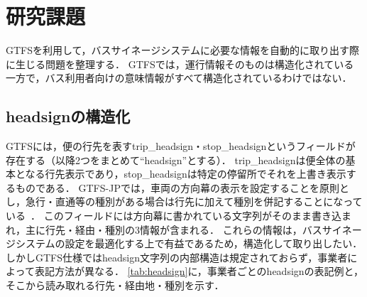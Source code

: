 \section{研究課題}
GTFSを利用して，バスサイネージシステムに必要な情報を自動的に取り出す際に生じる問題を整理する．
GTFSでは，運行情報そのものは構造化されている一方で，バス利用者向けの意味情報がすべて構造化されているわけではない．

\subsection{headsignの構造化}
\label{subsection:headsign}
GTFSには，便の行先を表すtrip\_headsign・stop\_headsignというフィールドが存在する（以降2つをまとめて``headsign''とする）．
trip\_headsignは便全体の基本となる行先表示であり，stop\_headsignは特定の停留所でそれを上書き表示するものである．
GTFS-JPでは，車両の方向幕の表示を設定することを原則とし，急行・直通等の種別がある場合は行先に加えて種別を併記することになっている~\cite{GTFSJPv4}．
このフィールドには方向幕に書かれている文字列がそのまま書き込まれ，主に行先・経由・種別の3情報が含まれる．
これらの情報は，バスサイネージシステムの設定を最適化する上で有益であるため，構造化して取り出したい．
しかしGTFS仕様ではheadsign文字列の内部構造は規定されておらず，事業者によって表記方法が異なる．
\cref{tab:headsign}に，事業者ごとのheadsignの表記例と，そこから読み取れる行先・経由地・種別を示す．

